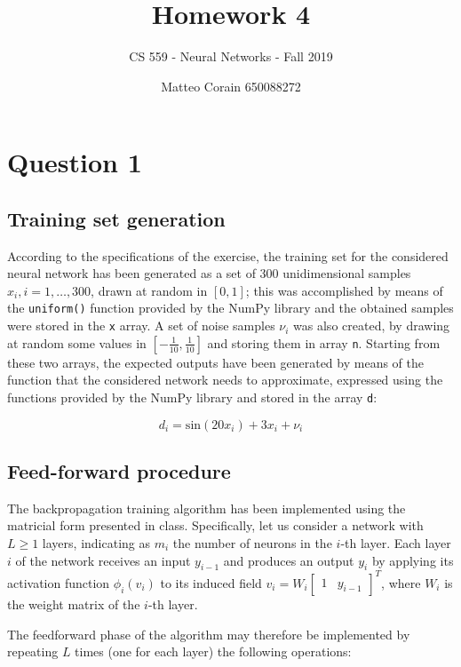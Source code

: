 \documentclass[letterpaper,headings=standardclasses]{scrartcl}
\title{Homework 4}
\subtitle{CS 559 - Neural Networks - Fall 2019}
\author{Matteo Corain 650088272}
\begin{document}
\maketitle

\section{Question 1}

\subsection{Training set generation}

According to the specifications of the exercise, the training set for the considered neural network has been generated as a set of 300 unidimensional samples $x_i, i = 1, \dots, 300$, drawn at random in $[0, 1]$; this was accomplished by means of the \texttt{uniform()} function provided by the NumPy library and the obtained samples were stored in the \texttt{x} array. A set of noise samples $\nu_i$ was also created, by drawing at random some values in $\left[-\frac{1}{10},\frac{1}{10}\right]$ and storing them in array \texttt{n}. Starting from these two arrays, the expected outputs have been generated by means of the function that the considered network needs to approximate, expressed using the functions provided by the NumPy library and stored in the array \texttt{d}:

$$ d_i = \text{sin}(20x_i) + 3x_i + \nu_i $$

\subsection{Feed-forward procedure}

The backpropagation training algorithm has been implemented using the matricial form presented in class. Specifically, let us consider a network with $L \ge 1 $ layers, indicating as $m_i$ the number of neurons in the $i$-th layer. Each layer $i$ of the network receives an input $y_{i - 1}$ and produces an output $y_i$ by applying its activation function $\phi_i (v_i)$ to its induced field $v_i = W_i \left[ \begin{matrix} 1 & y_{i - 1} \end{matrix} \right]^T$, where $W_i$ is the weight matrix of the $i$-th layer.

The feedforward phase of the algorithm may therefore be implemented by repeating $L$ times (one for each layer) the following operations:
\end{document}
